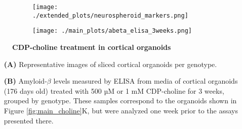 \begin{figure}[H]
    \begin{subfigure}[t]{0.7\textwidth}
        \caption{}
        \texttt{[image: ./extended\_plots/neurospheroid\_markers.png]}        
    \end{subfigure}
    \par
    \begin{subfigure}[t]{0.7\textwidth}
        \caption{}
        \texttt{[image: ./main\_plots/abeta\_elisa\_3weeks.png]}        
    \end{subfigure}
    \caption{
        \textbf{CDP-choline treatment in cortical organoids}\\
    }
    \label{fig:neurospheroid_figure}
\end{figure}
\begin{itemize}
    \item[\textbf{(A)}] Representative images of sliced cortical organoids per genotype. 
    \item[\textbf{(B)}] Amyloid-$\beta$ levels measured by ELISA from media of cortical organoids (176 days old) treated with 500 µM or 1 mM CDP-choline for 3 weeks, grouped by genotype. These samples correspond to the organoids shown in Figure \ref{fig:main_choline}K, but were analyzed one week prior to the assays presented there.\end{itemize}